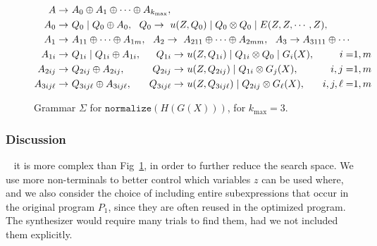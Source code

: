 \begin{figure}
\footnotesize
%
\begin{alignat*}{3}
A \rightarrow \ & \parbox{15mm}{\mbox{$A_0 \oplus A_1 \oplus \cdots \oplus A_{k_{\max}},$}} \\
A_0 \rightarrow \ & \parbox{15mm}{\mbox{$Q_0 \mid Q_0 \oplus A_0,\ \ Q_0 \rightarrow \ u(Z,Q_0) \mid Q_0 \otimes Q_0 \mid E(Z,Z,\cdots, Z),$}}\\
A_1\rightarrow \ & \parbox{15mm}{\mbox{$A_{11} \oplus \cdots \oplus A_{1m},\ \ A_2\rightarrow  \  A_{211} \oplus \cdots \oplus A_{2mm}, \ \ A_3 \rightarrow A_{3111}\oplus \cdots$}}\\
A_{1i} \rightarrow \ & Q_{1i} \mid Q_{1i} \oplus A_{1i}, & Q_{1i} \rightarrow \ & u(Z,Q_{1i}) \mid Q_{1i} \otimes Q_0 \mid G_i(X), &i=&1,m\\
A_{2ij} \rightarrow \ & Q_{2ij} \oplus A_{2ij}, & Q_{2ij} \rightarrow \ & u(Z,Q_{2ij}) \mid Q_{1i} \otimes G_j(X), &i,j=&1,m\\
A_{3ij\ell} \rightarrow \ & Q_{3ij\ell} \oplus A_{3ij\ell}, &Q_{3ij\ell} \rightarrow \ & u(Z,Q_{3ij\ell}) \mid Q_{2ij} \otimes G_\ell(X), &i,j,\ell=&1,m
  \end{alignat*}
\caption{Grammar $\Sigma$ for $\texttt{normalize}(H(G(X)))$, for $k_{\max}=3$.}
  \label{fig:grammar}
\end{figure}




\subsubsection{Discussion}\label{sec:grammar}\  it is more complex than
Fig~\ref{fig:grammar}, in order to further reduce the search space.
We use more non-terminals to better control which variables $z$ can be
used where, and we also consider the choice of including entire
subexpressions that occur in the original program $P_1$, since they
are often reused in the optimized program. The synthesizer would
require many trials to find them, had we not included them explicitly.


